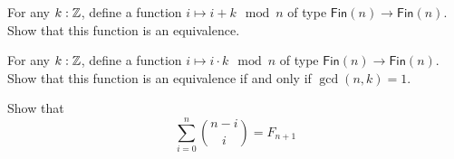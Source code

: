 \begin{exercises}
\item For any $k:{\mathbb{Z}}$, define a function $i\mapsto i+k \mod n$ of type $\mathsf{Fin}(n)\to\mathsf{Fin}(n)$. Show that this function is an equivalence.
\item For any $k:{\mathbb{Z}}$, define a function $i\mapsto i\cdot k \mod n$ of type $\mathsf{Fin}(n)\to\mathsf{Fin}(n)$. Show that this function is an equivalence if and only if $\gcd(n,k)=1$.
\item Show that
  \begin{equation*}
    \sum_{i=0}^n \binom{n-i}{i}=F_{n+1}
  \end{equation*}
\end{exercises}
